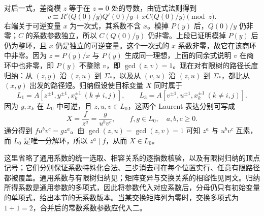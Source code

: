 \begin{proofsketch}
	对后一式，差商模 \(z\) 等于在 \(z=0\) 处的导数，由链式法则得到
	\[
		v\equiv R'\bigl(Q(0)/y\bigr)Q'(0)/y +xC\bigl(Q(0)/y\bigr)\pmod z.
	\]
	右端关于可逆变量 \(x\) 为一次式，其系数不含 \(x\)。模掉 \(P(y)\) 后，\(Q(0)/y\) 仍非零；\(C\) 的系数参数独立，所以 \(C(Q(0)/y)\) 仍非零。上段已证明模掉 \(P(y)\) 后仍为整环，且 \(x\) 仍是独立的可逆变量。这个一次式的 \(x\) 系数非零，故它在该商环中非零。因为 \(z=P(y)/x\) 与 \(P(y)\) 生成同一理想，上面的同余式说明 \(v\) 在商环中也非零，即 \(P(y)\) 不整除 \(v\)，即 \(\gcd(z,v)=1\)。现在对有限树的路径长度归纳：从 \((z,y)\) 沿 \((z,u)\) 到 \(\Sigma_*\)，以及从 \((v,u)\) 沿 \((z,u)\) 到 \(\Sigma_*\)，都比从 \((x,y)\) 出发的路径短。归纳假设使目标变量 \(X\) 同时属于
	\[
		L_1=A[z^{\pm1},y^{\pm1},x_k^{\pm1}\ (k\ne i,j)],\qquad L_3=A[v^{\pm1},u^{\pm1},x_k^{\pm1}\ (k\ne i,j)].
	\]
	因为 \(y,x_k\) 在 \(L_0\) 中可逆，且 \(z,u,v\in L_0\)，这两个 Laurent 表达分别可写成
	\[
		X=\frac{f}{z^a}=\frac{g}{u^bv^c}, \qquad f,g\in L_0,\quad a,b,c\ge0.
	\]
	通分得到 \(fu^bv^c=gz^a\)。由 \(\gcd(z,u)=\gcd(z,v)=1\) 可知 \(z^a\) 与 \(u^bv^c\) 互素，而 \(L_0\) 是唯一分解环，所以 \(z^a\mid f\)，从而 \(X\in L_0\)。

	这里省略了通用系数的统一选取、相容关系的逐指数核验，以及有限树归纳的顶点记号；它们分别保证系数特殊化合法、三步消去可在每个位置实行、任意有限路径都被覆盖。通用系数与有限树归纳见\cite[Section 3, Theorem 3.2 and Lemma 3.3]{FominZelevinsky2002ClusterFoundations}；矩阵变异与交换关系的相容性见同文\cite[Section 4, Definition 4.2, Proposition 4.3 and Proposition 4.5]{FominZelevinsky2002ClusterFoundations}。归纳所得系数是通用参数的多项式，因此将参数代入对应系数后，分母仍只有初始变量的单项式，给出本节的无系数版本。当某交换矩阵列为零时，交换多项式为 \(1+1=2\)，合并后的常数系数参数应代入二。
\end{proofsketch}

